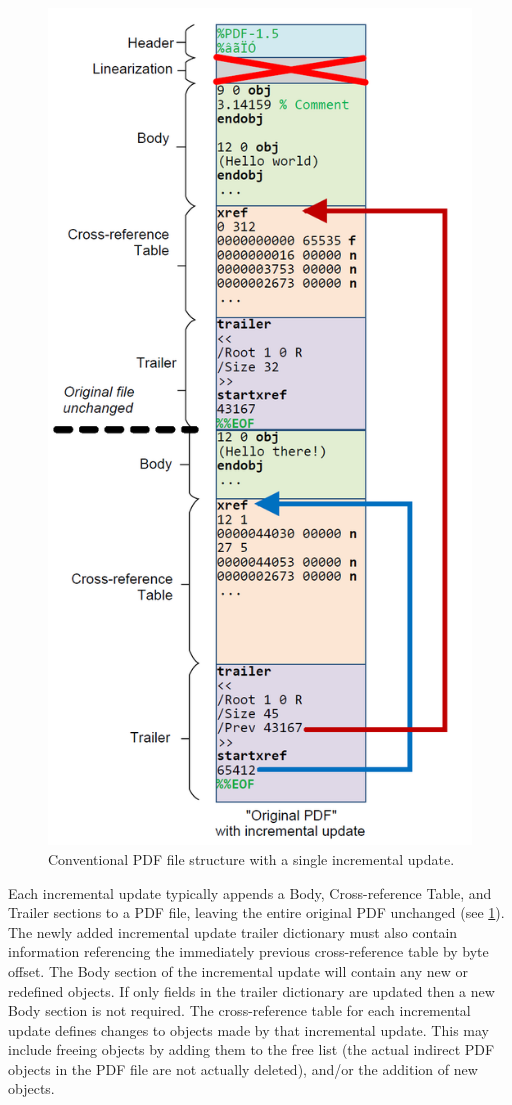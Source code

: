 \begin{figure}[t]
    \centering
    \includegraphics[width=0.65\linewidth]{figures/pdf-structure-incremental.png}
    \caption{Conventional PDF file structure with a single incremental update.}
    \label{fig:pdf-structure-incremental}
\end{figure}

Each incremental update typically appends a Body, Cross-reference
Table, and Trailer sections to a PDF file, leaving the entire original
PDF unchanged (see \cref{fig:pdf-structure-incremental}).
%
The newly added incremental update trailer dictionary must also
contain information referencing the immediately previous
cross-reference table by byte offset. The Body section of the
incremental update will contain any new or redefined objects. If only
fields in the trailer dictionary are updated then a new Body section
is not required. The cross-reference table for each incremental update
defines changes to objects made by that incremental update. This may
include freeing objects by adding them to the free list (the actual
indirect PDF objects in the PDF file are not actually deleted), and/or
the addition of new objects.


